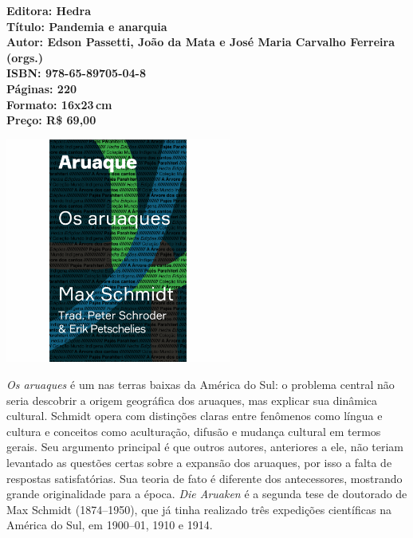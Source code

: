 \vfill

\noindent\begin{minipage}[c]{.5\linewidth}
{\small\textbf{
\hspace*{-.1cm}Editora: Hedra\\
Título: Pandemia e anarquia\\
Autor: Edson Passetti, João da Mata e José Maria Carvalho Ferreira (orgs.)\\ 
ISBN: 978-65-89705-04-8\\
Páginas: 220\\
Formato: 16x23\,cm\\
Preço: R\$ 69,00\\
}}
\end{minipage}

\pagebreak

\begin{center}
\hspace*{-3.6cm}
\hspace*{3.1cm}\includegraphics[width=74mm]{./CAPAS/aruaque.jpg}
\end{center}

\hspace*{-7cm}\hrulefill\hspace*{-7cm}

\medskip

\noindent{}\textit{Os aruaques} é um  nas terras baixas da América do Sul: o problema central não seria descobrir a origem geográfica dos aruaques, mas explicar sua dinâmica cultural. Schmidt opera com distinções claras entre fenômenos como língua e cultura e conceitos como aculturação, difusão e mudança cultural em termos gerais. Seu argumento principal é que outros autores, anteriores a ele, não teriam levantado as questões certas sobre a expansão dos aruaques, por isso a falta de respostas satisfatórias. Sua teoria de fato é diferente dos antecessores, mostrando grande originalidade para a época. \textit{Die Aruaken} é a segunda tese de doutorado de Max Schmidt (1874--1950), que já tinha realizado três expedições científicas na América do Sul, em 1900--01, 1910 e 1914.

